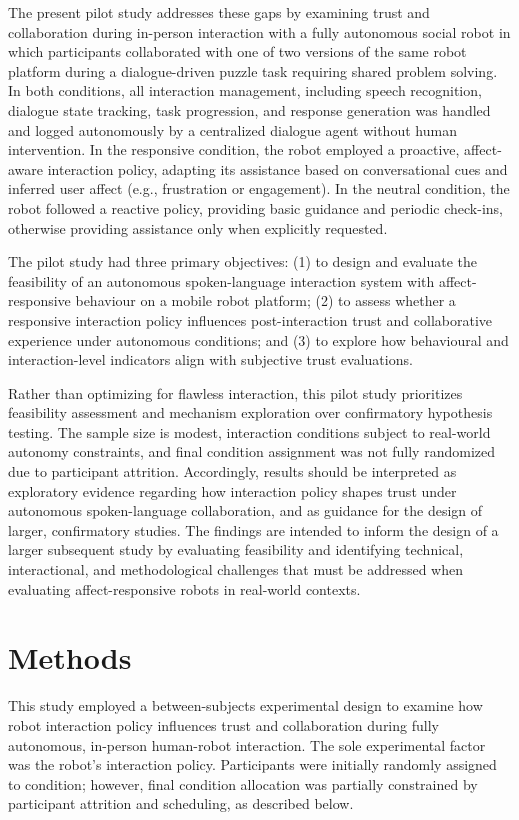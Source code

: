 \documentclass[
]{article}
\begin{document}
The present pilot study addresses these gaps by examining trust and
collaboration during in-person interaction with a fully autonomous
social robot in which participants collaborated with one of two versions
of the same robot platform during a dialogue-driven puzzle task
requiring shared problem solving. In both conditions, all interaction
management, including speech recognition, dialogue state tracking, task
progression, and response generation was handled and logged autonomously
by a centralized dialogue agent without human intervention. In the
responsive condition, the robot employed a proactive, affect-aware
interaction policy, adapting its assistance based on conversational cues
and inferred user affect (e.g., frustration or engagement). In the
neutral condition, the robot followed a reactive policy, providing basic
guidance and periodic check-ins, otherwise providing assistance only
when explicitly requested.

The pilot study had three primary objectives: (1) to design and evaluate
the feasibility of an autonomous spoken-language interaction system with
affect-responsive behaviour on a mobile robot platform; (2) to assess
whether a responsive interaction policy influences post-interaction
trust and collaborative experience under autonomous conditions; and (3)
to explore how behavioural and interaction-level indicators align with
subjective trust evaluations.

Rather than optimizing for flawless interaction, this pilot study
prioritizes feasibility assessment and mechanism exploration over
confirmatory hypothesis testing. The sample size is modest, interaction
conditions subject to real-world autonomy constraints, and final
condition assignment was not fully randomized due to participant
attrition. Accordingly, results should be interpreted as exploratory
evidence regarding how interaction policy shapes trust under autonomous
spoken-language collaboration, and as guidance for the design of larger,
confirmatory studies. The findings are intended to inform the design of
a larger subsequent study by evaluating feasibility and identifying
technical, interactional, and methodological challenges that must be
addressed when evaluating affect-responsive robots in real-world
contexts.

\section{Methods}\label{methods}

This study employed a between-subjects experimental design to examine
how robot interaction policy influences trust and collaboration during
fully autonomous, in-person human-robot interaction. The sole
experimental factor was the robot's interaction policy. Participants
were initially randomly assigned to condition; however, final condition
allocation was partially constrained by participant attrition and
scheduling, as described below.
\end{document}
